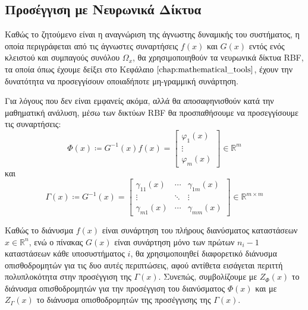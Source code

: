 \subsection{Προσέγγιση με Νευρωνικά Δίκτυα} \label{subsec:schema_rbf}
Καθώς το ζητούμενο είναι η αναγνώριση της άγνωστης δυναμικής του συστήματος, η οποία περιγράφεται από τις άγνωστες συναρτήσεις $f(x)$ και $G(x)$ εντός ενός κλειστού και συμπαγούς συνόλου $\Omega_x$, θα χρησιμοποιηθούν τα νευρωνικά δίκτυα RBF, τα οποία όπως έχουμε δείξει στο Κεφάλαιο $\ref{chap:mathematical_tools}$, έχουν την δυνατότητα να προσεγγίσουν οποιαδήποτε μη-γραμμική συνάρτηση.

Για λόγους που δεν είναι εμφανείς ακόμα, αλλά θα αποσαφηνισθούν κατά την μαθηματική ανάλυση, μέσω των δικτύων RBF θα προσπαθήσουμε να προσεγγίσουμε τις συναρτήσεις:
\begin{equation}
	\Phi(x) \coloneqq G^{-1}(x)f(x) = 
	\begin{bmatrix}
	\varphi_1(x) \\ \vdots \\ \varphi_m(x)
	\end{bmatrix} \in \mathbb{R}^m
	\label{eq:approximate_F}
\end{equation}
και
\begin{equation}
\Gamma(x) \coloneqq G^{-1}(x) = 
\begin{bmatrix} \gamma_{11}(x) & \cdots & \gamma_{1m}(x) \\
					 \vdots    & \ddots & \vdots         \\
				\gamma_{m1}(x) & \cdots & \gamma_{mm}(x)
\end{bmatrix} \in \mathbb{R}^{m \times m}
\label{eq:approximate_G}
\end{equation}

Καθώς το διάνυσμα $f(x)$ είναι συνάρτηση του πλήρους διανύσματος καταστάσεων $x \in \mathbb{R}^n$, ενώ ο πίνακας $G(x)$ είναι συνάρτηση μόνο των πρώτων $n_i - 1$ καταστάσεων κάθε υποσυστήματος $i$, θα χρησιμοποιηθεί διαφορετικό διάνυσμα οπισθοδρομητών για τις δυο αυτές περιπτώσεις, αφού αντίθετα εισάγεται περιττή πολυπλοκότητα στην προσέγγιση της $\Gamma(x)$. Συνεπώς, συμβολίζουμε με $Z_{\varPhi}(x)$ το διάνυσμα οπισθοδρομητών για την προσέγγιση του διανύσματος $\varPhi(x)$ και με $Z_{\Gamma}(x)$ το διάνυσμα οπισθοδρομητών της προσέγγισης της $\Gamma(x)$.

